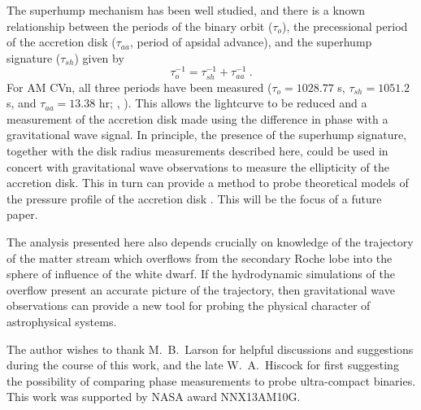 \documentclass[preprint2]{aastex}
\begin{document}
The superhump mechanism has been well studied, and there is a known 
relationship between the periods of the binary orbit ($\tau_{o}$), the 
precessional period of the accretion disk ($\tau_{aa}$, period of 
apsidal advance), and the superhump signature ($\tau_{sh}$) given by
\begin{equation}
    \tau_{o}^{-1} =  \tau_{sh}^{-1} +  \tau_{aa}^{-1} \ .
    \label{PeriodTheory}
\end{equation}
For AM CVn, all three periods have been measured ($\tau_{o} = 1028.77$
s, $\tau_{sh} = 1051.2$ s, and $\tau_{aa} = 13.38$ hr; \citep{PHS},
\citep{1998ApJ...493L.105H}).  This allows the lightcurve to be
reduced and a measurement of the accretion disk made using the
difference in phase with a gravitational wave signal.  In principle,
the presence of the superhump signature, together with the disk radius
measurements described here, could be used in concert with
gravitational wave observations to measure the ellipticity of the
accretion disk.  This in turn can provide a method to probe
theoretical models of the pressure profile of the accretion disk 
\citep{2006MNRAS.368.1123G}.  This will be the focus of a future 
paper.

The analysis presented here also depends crucially on knowledge of the
trajectory of the matter stream which overflows from the secondary
Roche lobe into the sphere of influence of the white dwarf.  If the
hydrodynamic simulations of the overflow present an accurate picture
of the trajectory, then gravitational wave observations can provide a
new tool for probing the physical character of astrophysical systems.

\acknowledgments The author wishes to thank M.\ B.\ Larson for helpful
discussions and suggestions during the course of this work, and the 
late W.\ A.\ Hiscock for first suggesting the possibility of comparing 
phase measurements to probe ultra-compact binaries.  This work was 
supported by NASA award NNX13AM10G.


\end{document}
